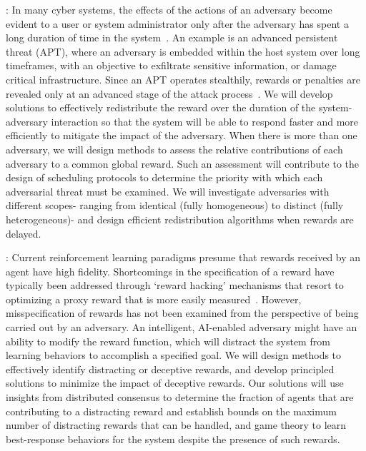 \documentclass{NSF}
\begin{document}
:
In many cyber systems, the effects of the actions of an adversary become evident to a user or system administrator only after the adversary has spent a long duration of time in the system~\cite{brogi2016terminaptor, ahmad2019strategically, alshamrani2019survey, huang2019adaptive}. An example is an advanced persistent threat (APT), where an adversary is embedded within the host system over long timeframes, with an objective to exfiltrate sensitive information, or damage critical infrastructure. Since an APT operates stealthily, rewards or penalties are revealed only at an advanced stage of the attack process~\cite{zhu2018multi, moothedath2020game, sahabandu2020quickest}. We will develop solutions to effectively redistribute the reward over the duration of the system-adversary interaction so that the system will be able to respond faster and more efficiently to mitigate the impact of the adversary. When there is more than one adversary, we will design methods to assess the relative contributions of each adversary to a common global reward. Such an assessment will contribute to the design of scheduling protocols to determine the priority with which each adversarial threat must be examined. We will investigate adversaries with different scopes- ranging from identical (fully homogeneous) to distinct (fully heterogeneous)- and design efficient redistribution algorithms when rewards are delayed.

:
Current reinforcement learning paradigms presume that rewards received by an agent have high fidelity. Shortcomings in the specification of a reward have typically been addressed through `reward hacking’ mechanisms that resort to optimizing a proxy reward that is more easily measured~\cite{talvitie2018learning, pan2021effects}. However, misspecification of rewards has not been examined from the perspective of being carried out by an adversary. An intelligent, AI-enabled adversary might have an ability to modify the reward function, which will distract the system from learning behaviors to accomplish a specified goal. We will design methods to effectively identify distracting or deceptive rewards, and develop principled solutions to minimize the impact of deceptive rewards. Our solutions will use insights from distributed consensus to determine the fraction of agents that are contributing to a distracting reward and establish bounds on the maximum number of distracting rewards that can be handled, and game theory to learn best-response behaviors for the system despite the presence of such rewards.
\end{document}
